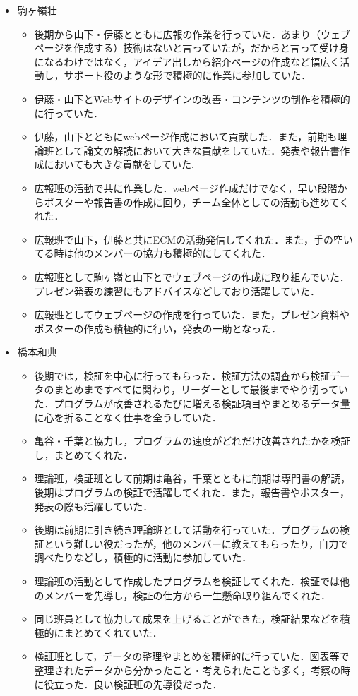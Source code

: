 \documentclass[openany,11pt,papersize]{jsbook}
\begin{document}
\begin{itemize}
\item 駒ヶ嶺壮
\begin{itemize}
\item 後期から山下・伊藤とともに広報の作業を行っていた．あまり（ウェブページを作成する）技術はないと言っていたが，だからと言って受け身になるわけではなく，アイデア出しから紹介ページの作成など幅広く活動し，サポート役のような形で積極的に作業に参加していた．
\item 伊藤・山下とWebサイトのデザインの改善・コンテンツの制作を積極的に行っていた．
\item 伊藤，山下とともにwebページ作成において貢献した．また，前期も理論班として論文の解読において大きな貢献をしていた．発表や報告書作成においても大きな貢献をしていた.
\item 広報班の活動で共に作業した．webページ作成だけでなく，早い段階からポスターや報告書の作成に回り，チーム全体としての活動も進めてくれた．
\item 広報班で山下，伊藤と共にECMの活動発信してくれた．また，手の空いてる時は他のメンバーの協力も積極的にしてくれた．
\item 広報班として駒ヶ嶺と山下とでウェブページの作成に取り組んでいた．プレゼン発表の練習にもアドバイスなどしており活躍していた．
\item 広報班としてウェブページの作成を行っていた．また，プレゼン資料やポスターの作成も積極的に行い，発表の一助となった．
\end{itemize}

\item 橋本和典
\begin{itemize}
\item 後期では，検証を中心に行ってもらった．検証方法の調査から検証データのまとめまですべてに関わり，リーダーとして最後までやり切っていた．プログラムが改善されるたびに増える検証項目やまとめるデータ量に心を折ることなく仕事を全うしていた．
\item 亀谷・千葉と協力し，プログラムの速度がどれだけ改善されたかを検証し，まとめてくれた．
\item 理論班，検証班として前期は亀谷，千葉とともに前期は専門書の解読，後期はプログラムの検証で活躍してくれた．また，報告書やポスター，発表の際も活躍していた．
\item 後期は前期に引き続き理論班として活動を行っていた．プログラムの検証という難しい役だったが，他のメンバーに教えてもらったり，自力で調べたりなどし，積極的に活動に参加していた．
\item 理論班の活動として作成したプログラムを検証してくれた．検証では他のメンバーを先導し，検証の仕方から一生懸命取り組んでくれた．
\item 同じ班員として協力して成果を上げることができた，検証結果などを積極的にまとめてくれていた．
\item 検証班として，データの整理やまとめを積極的に行っていた．図表等で整理されたデータから分かったこと・考えられたことも多く，考察の時に役立った．良い検証班の先導役だった．
\end{itemize}


\end{itemize}
\end{document}
